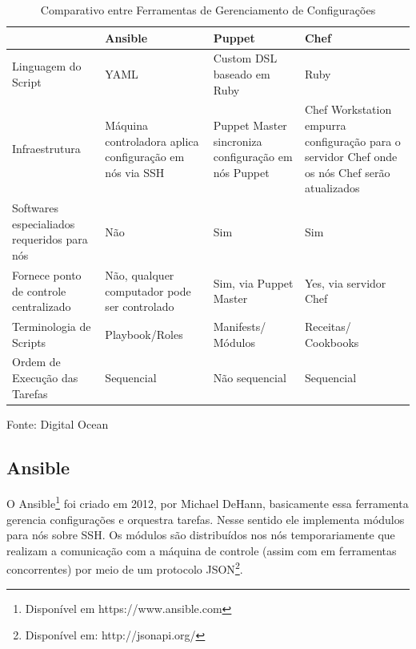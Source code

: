 \begin{table}[h]
	\centering

	\begin{tabular}{|p{3.0cm}|p{3.0cm}|p{3.0cm}|p{3.0cm}|}
		\cline{1-4}
		
		  & Ansible &Puppet & Chef \\ %
		\hline                               %
		Linguagem do Script & YAML        & Custom DSL baseado em Ruby & Ruby\\ \cline{1-4}
		
		Infraestrutura & Máquina controladora aplica configuração em nós via SSH  & Puppet Master sincroniza configuração em nós Puppet & Chef Workstation empurra configuração para o servidor Chef onde os nós Chef serão atualizados  \\ \cline{1-4}
		
		Softwares especialiados requeridos para nós & Não & Sim & Sim\\ \cline{1-4}
		
		Fornece ponto de controle centralizado & Não, qualquer computador pode ser controlado &  Sim, via  Puppet Master & Yes, via servidor Chef \\ \cline{1-4}
		
		Terminologia de Scripts & Playbook/Roles & Manifests/ Módulos & Receitas/ Cookbooks \\ \cline{1-4}
		
		Ordem de Execução das Tarefas & Sequencial & Não sequencial & Sequencial \\ \cline{1-4}         
		
	\end{tabular}
	\caption{Comparativo entre Ferramentas de Gerenciamento de Configurações}
	Fonte: Digital Ocean\footnotemark
\end{table}


\subsection{Ansible}

O Ansible\footnote{Disponível em https://www.ansible.com} foi criado em 2012, por Michael DeHann, basicamente essa ferramenta gerencia configurações e orquestra tarefas. Nesse sentido ele implementa módulos para nós sobre SSH. Os módulos são distribuídos nos nós temporariamente que realizam a comunicação com a máquina de controle (assim com em ferramentas concorrentes) por meio de um protocolo JSON\footnote{Disponível em: http://jsonapi.org/}.

